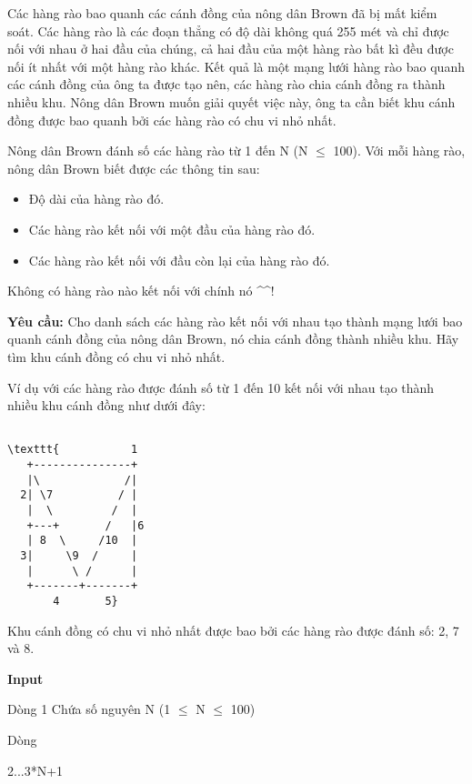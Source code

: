 

Các hàng rào bao quanh các cánh đồng của nông dân Brown đã bị mất kiểm soát. Các hàng rào là các đoạn thẳng có độ dài không quá 255 mét và chỉ được nối với nhau ở hai đầu của chúng, cả hai đầu của một hàng rào bất kì đều được nối ít nhất với một hàng rào khác. Kết quả là một mạng lưới hàng rào bao quanh các cánh đồng của ông ta được tạo nên, các hàng rào chia cánh đồng ra thành nhiều khu. Nông dân Brown muốn giải quyết việc này, ông ta cần biết khu cánh đồng được bao quanh bởi các hàng rào có chu vi nhỏ nhất.

Nông dân Brown đánh số các hàng rào từ 1 đến N (N $\le$ 100). Với mỗi hàng rào, nông dân Brown biết được các thông tin sau:
\begin{itemize}
	\item Độ dài của hàng rào đó.
	\item Các hàng rào kết nối với một đầu của hàng rào đó.
	\item Các hàng rào kết nối với đầu còn lại của hàng rào đó.
\end{itemize}

Không có hàng rào nào kết nối với chính nó \textasciicircum\textasciicircum!

\textbf{Yêu cầu: } Cho danh sách các hàng rào kết nối với nhau tạo thành mạng lưới bao quanh cánh đồng của nông dân Brown, nó chia cánh đồng thành nhiều khu. Hãy tìm khu cánh đồng có chu vi nhỏ nhất.

Ví dụ với các hàng rào được đánh số từ 1 đến 10 kết nối với nhau tạo thành nhiều khu cánh đồng như dưới đây:
\begin{verbatim}

\texttt{           1
   +---------------+
   |\             /|
  2| \7          / |
   |  \         /  |
   +---+       /   |6
   | 8  \     /10  |
  3|     \9  /     |
   |      \ /      |
   +-------+-------+
       4       5}\end{verbatim}

Khu cánh đồng có chu vi nhỏ nhất được bao bởi các hàng rào được đánh số: 2, 7 và 8.   

\textbf{Input }

Dòng 1 Chứa số nguyên N (1  $\le$  N  $\le$  100)

Dòng

2...3*N+1

